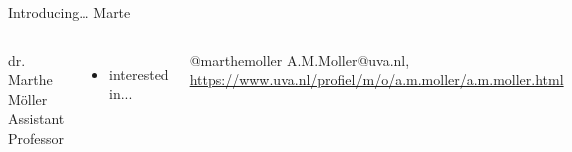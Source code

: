 \documentclass[handout]{beamer}
\begin{document}
\begin{frame}{Introducing\ldots} {\huge{Marte}} \small{} 
	
	\begin{columns}
		dr. Marthe Möller \\
		Assistant Professor
		\begin{itemize}
			\item interested in... 
		\end{itemize}
		@marthemoller \textbar A.M.Moller@uva.nl, \textbar \url{https://www.uva.nl/profiel/m/o/a.m.moller/a.m.moller.html} 
	\end{columns}
\end{frame}
\end{document}
